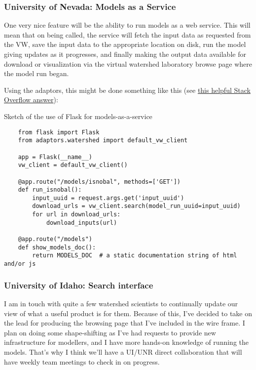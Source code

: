 \documentclass[
11pt, %
a4paper, %
oneside, %
twoside, %
headinclude,footinclude, %
BCOR5mm, %
]{scrartcl}
\begin{document}
\subsubsection{University of Nevada: Models as a Service} %
\label{ssub:UNR_maas}

One very nice feature will be the ability to run models as a web service. This will mean that
on being called, the service will fetch the input data as requested from the VW, save the input
data to the appropriate location on disk, run the model giving updates as it progresses, and 
finally making the output data available for download or visualization via the virtual watershed
laboratory browse page where the model run began.

Using the adaptors, this might be done something like this 
(see \href{http://stackoverflow.com/questions/15182696/multiple-parameters-in-in-flask-approute}{this helpful Stack Overflow answer}):
\begin{listing}
    \caption{Sketch of the use of Flask for models-as-a-service}
\begin{verbatim}
    from flask import Flask
    from adaptors.watershed import default_vw_client

    app = Flask(__name__)
    vw_client = default_vw_client()

    @app.route("/models/isnobal", methods=['GET'])
    def run_isnobal():
        input_uuid = request.args.get('input_uuid')
        download_urls = vw_client.search(model_run_uuid=input_uuid)
        for url in download_urls:
            download_inputs(url)

    @app.route("/models")
    def show_models_doc():
        return MODELS_DOC  # a static documentation string of html and/or js
\end{verbatim}
\label{lst:demo_app}
\end{listing}


\subsubsection{University of Idaho: Search interface} %
\label{ssub:UI_search_interface}

I am in touch with quite a few watershed scientists to continually update our view of what
a useful product is for them. Because of this, I've decided to take on the lead for 
producing the browsing page that I've included in the wire frame. I plan on doing some 
shape-shifting as I've had requests to provide new infrastructure for modellers, and I have 
more hands-on knowledge of running the models. That's why I think we'll have a UI/UNR 
direct collaboration that will have weekly team meetings to check in on progress.
\end{document}
